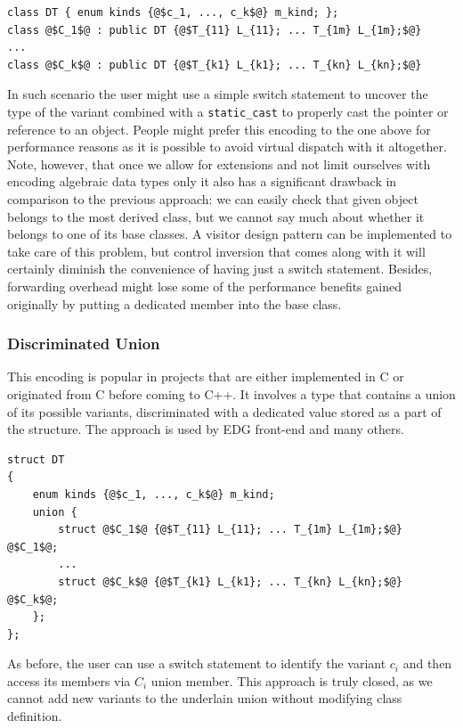 \documentclass[preprint]{sigplanconf}
\makeatletter
\DeclareRobustCommand{\code}[1]{{\lstinline[breaklines=false,escapechar=@]{#1}}}
\makeatother
\begin{document}
\begin{lstlisting}[keepspaces,columns=flexible]
class DT { enum kinds {@$c_1, ..., c_k$@} m_kind; };
class @$C_1$@ : public DT {@$T_{11} L_{11}; ... T_{1m} L_{1m};$@} 
...
class @$C_k$@ : public DT {@$T_{k1} L_{k1}; ... T_{kn} L_{kn};$@} 
\end{lstlisting}

In such scenario the user might use a simple switch statement to uncover the 
type of the variant combined with a \code{static_cast} to properly cast the 
pointer or reference to an object. People might prefer this encoding to the one 
above for performance reasons as it is possible to avoid virtual dispatch with 
it altogether. Note, however, that once we allow for extensions and not limit 
ourselves with encoding algebraic data types only it also has a significant 
drawback in comparison to the previous approach: we can easily check that given 
object belongs to the most derived class, but we cannot say much about whether 
it belongs to one of its base classes. A visitor design pattern can be 
implemented to take care of this problem, but control inversion that comes along 
with it will certainly diminish the convenience of having just a switch 
statement. Besides, forwarding overhead might lose some of the performance 
benefits gained originally by putting a dedicated member into the base class.

\subsubsection{Discriminated Union}
\label{sec:du}

This encoding is popular in projects that are either implemented in C or 
originated from C before coming to C++. It involves a type that contains a union 
of its possible variants, discriminated with a dedicated value stored as a part 
of the structure. The approach is used by EDG front-end\cite{EDG} and many others.

\begin{lstlisting}[keepspaces,columns=flexible]
struct DT
{
    enum kinds {@$c_1, ..., c_k$@} m_kind;
    union {
        struct @$C_1$@ {@$T_{11} L_{11}; ... T_{1m} L_{1m};$@} @$C_1$@;
        ...
        struct @$C_k$@ {@$T_{k1} L_{k1}; ... T_{kn} L_{kn};$@} @$C_k$@; 
    };
};
\end{lstlisting}

As before, the user can use a switch statement to identify the variant $c_i$ and 
then access its members via $C_i$ union member. This approach is truly closed, as 
we cannot add new variants to the underlain union without modifying class 
definition. 
\end{document}
